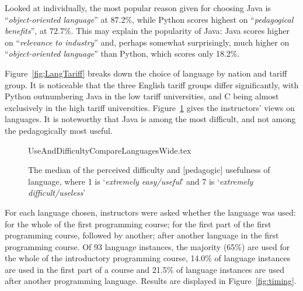 \documentclass[english,submission]{programming}
\begin{document}
Looked at individually, the most popular reason given for choosing
Java is ``{\emph{object-oriented language}}'' at 87.2\%, while Python
scores highest on ``{\emph{pedagogical benefits}}'', at 72.7\%. This
may explain the popularity of Java: Java scores higher on
``{\emph{relevance to industry}}'' and, perhaps somewhat surprisingly,
much higher on ``{\emph{object-oriented language}}'' than Python,
which scores only 18.2\%.


Figure~\ref{fig;LangTariff} breaks down the choice of language by
nation and tariff group.  It is noticeable that the three English
tariff groups differ significantly, with Python outnumbering Java in
the low tariff universities, and C being almost exclusively in the
high tariff universities. Figure~\ref{fig:utility} gives the
instructors' views on languages. It is noteworthy that Java is among
the most difficult, and not among the pedagogically most useful.

\begin{figure}
\begin{center}
{UseAndDifficultyCompareLanguagesWide.tex}
\end{center}
\caption{The median of the perceived difficulty and [pedagogic] usefulness of language, where 1 is `{\emph{extremely easy/useful}}' and 7 is `{\emph{extremely difficult/useless}}'%
\label{fig:utility}}
\end{figure}

For each language chosen, instructors were asked whether the language
was used: for the whole of the first programming course; for the first
part of the first programming course, followed by another; after
another language in the first programming course. Of 93 language
instances, the majority (65\%) are used for the whole of the
introductory programming course, 14.0\% of language instances are used
in the first part of a course and 21.5\% of language instances are
used after another programming language. Results are displayed in
Figure~\ref{fig:timing}.
\end{document}
